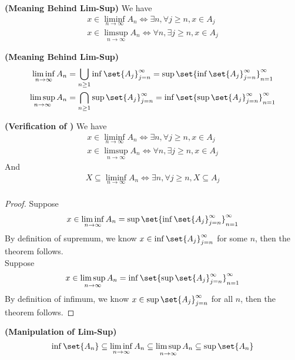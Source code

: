 \documentclass{report}
\begin{document}
\begin{theorem}
\label{0.7.11}
\textbf{(Meaning Behind Lim-Sup)} We have
\begin{gather*}
x\in \liminf_{n\to\infty} A_n\iff \exists  n,\forall  j\geq n, x\in A_j\\
x\in \limsup_{n\to\infty} A_n\iff \forall n,\exists j\geq n, x\in A_j
\end{gather*}
\end{theorem}
\begin{theorem}
\label{0.7.12}
\textbf{(Meaning Behind Lim-Sup)}
\begin{gather*}
\liminf_{n\to\infty} A_n=\bigcup_{n\geq 1}\inf \set{A_j}_{j=n}^\infty=\sup \set{\inf \set{A_j}_{j=n}^\infty}_{n=1}^\infty\\
\limsup_{n\to\infty} A_n=\bigcap_{n\geq 1}\sup \set{A_j}_{j=n}^\infty=\inf \set{\sup \set{A_j}_{j=n}^\infty}_{n=1}^\infty
\end{gather*}
\end{theorem}
\begin{corollary}
\label{0.7.13}
\textbf{(Verification of )} We have
\begin{gather*}
x\in \liminf_{n\to\infty} A_n\iff \exists  n,\forall  j\geq n, x\in A_j\\
x\in \limsup_{n\to\infty} A_n\iff \forall n,\exists j\geq n, x\in A_j
\end{gather*}
And
\begin{gather*}
X\subseteq \liminf_{n\to\infty} A_n\iff \exists n,\forall j\geq n,X\subseteq A_j\\
\end{gather*}
\end{corollary}
\begin{proof}
Suppose
\begin{equation*}
x\in \liminf_{n\to\infty} A_n=\sup \set{\inf \set{A_j}_{j=n}^\infty}_{n=1}^\infty
\end{equation*}
By definition of supremum, we know $x\in \inf \set{A_j}_{j=n}^\infty$ for some $n$, then the theorem follows.\\

Suppose 
\begin{equation*}
x\in \limsup_{n\to\infty} A_n=\inf \set{\sup \set{A_j}_{j=n}^\infty}_{n=1}^\infty
\end{equation*}
By definition of infimum, we know $x \in \sup \set{A_j}_{j=n}^\infty$ for all $n$, then the theorem follows.
\end{proof}
\begin{corollary}
\label{0.7.14}
\textbf{(Manipulation of Lim-Sup)}
\begin{equation*}
\inf \set{A_n}\subseteq \liminf_{n\to\infty} A_n\subseteq \limsup_{n\to\infty} A_n\subseteq \sup \set{A_n}
\end{equation*}
\end{corollary}
\end{document}
